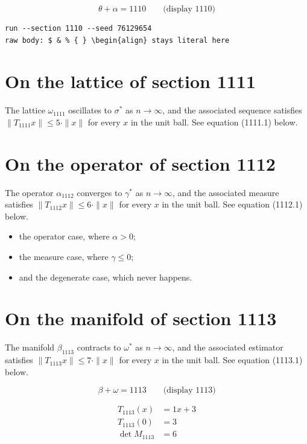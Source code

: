 \documentclass{article}
\begin{document}
$$
\theta + \alpha = 1110 \qquad \text{(display 1110)}
$$

\begin{verbatim}
run --section 1110 --seed 76129654
raw body: $ & % { } \begin{align} stays literal here
\end{verbatim}

\section{On the lattice of section 1111}
The lattice $\omega_{1111}$ oscillates to $\sigma^{*}$ as $n \to \infty$,
and the associated sequence satisfies $\|T_{1111} x\| \leq 5 \cdot \|x\|$
for every $x$ in the unit ball. See equation (1111.1) below.

\section{On the operator of section 1112}
The operator $\alpha_{1112}$ converges to $\gamma^{*}$ as $n \to \infty$,
and the associated measure satisfies $\|T_{1112} x\| \leq 6 \cdot \|x\|$
for every $x$ in the unit ball. See equation (1112.1) below.

\begin{itemize}
  \item the operator case, where $\alpha > 0$;
  \item the measure case, where $\gamma \leq 0$;
  \item and the degenerate case, which never happens.
\end{itemize}

\section{On the manifold of section 1113}
The manifold $\beta_{1113}$ contracts to $\omega^{*}$ as $n \to \infty$,
and the associated estimator satisfies $\|T_{1113} x\| \leq 7 \cdot \|x\|$
for every $x$ in the unit ball. See equation (1113.1) below.

$$
\beta + \omega = 1113 \qquad \text{(display 1113)}
$$

\begin{align}
T_{1113}(x) &= 1 x + 3 \\
T_{1113}(0) &= 3 \\
\det M_{1113} &= 6
\end{align}
\end{document}
